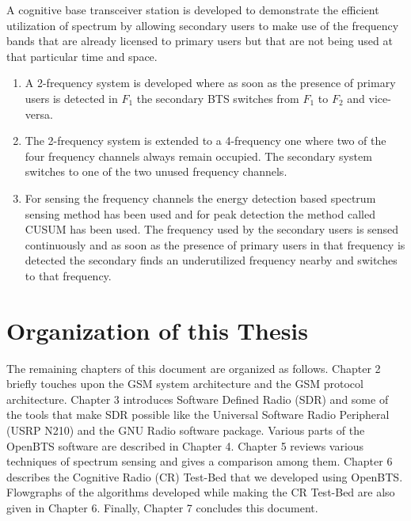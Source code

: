 A cognitive base transceiver station is developed to demonstrate the efficient 
utilization of spectrum by allowing secondary users to make use of the 
frequency bands that are already licensed to primary users but that are not 
being used at that particular time and space.

\begin{enumerate}
    \item A 2-frequency system is developed where as soon as the presence of 
    primary users is detected in $F_1$  the secondary BTS switches from $F_1$ 
    to $F_2$ and vice-versa.
    \item The 2-frequency system is extended to a 4-frequency one where
    two of the four frequency channels always remain occupied. The secondary
    system switches to one of the two unused frequency channels.
    \item For sensing the frequency channels the energy detection based
    spectrum sensing method has been used and for peak detection the method 
    called CUSUM has been used. The frequency used by the secondary users is
    sensed continuously and as soon as the presence of primary users in that 
    frequency is detected the secondary finds an underutilized frequency 
    nearby and switches to that frequency.  
\end{enumerate}



\section{Organization of this Thesis}
The remaining chapters of this document are organized as follows. Chapter 2 
briefly touches upon the GSM system architecture and the GSM protocol 
architecture. Chapter 3 introduces Software Defined Radio (SDR) and some of the
tools that make SDR possible like the Universal Software Radio Peripheral 
(USRP N210) and the GNU Radio software package. Various parts of the OpenBTS 
software are described in Chapter 4. Chapter 5 reviews various techniques of 
spectrum sensing and gives a comparison among them. Chapter 6 describes the 
Cognitive Radio (CR) Test-Bed that we developed using OpenBTS. Flowgraphs of
the algorithms developed while making the CR Test-Bed are also given in
Chapter 6. Finally, Chapter 7 concludes this document.

